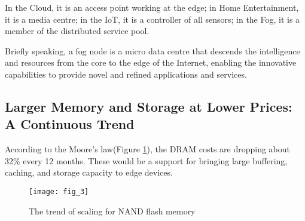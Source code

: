 In the Cloud, it is an access point working at the edge; in Home Entertainment, it is a
media centre; in the IoT, it is a controller of all sensors; in the Fog, it is a member of the
distributed service pool.

Briefly speaking, a fog node is a micro data centre that descends the intelligence and
resources from the core to the edge of the Internet, enabling the innovative capabilities to
provide novel and refined applications and services.

\subsection{Larger Memory and Storage at Lower Prices: A Continuous Trend}
According to the Moore's law(Figure \ref{fig_3}), the DRAM costs are dropping about 32\% every 12
months. These would be a support for bringing large buffering, caching, and storage
capacity to edge devices.

\begin{figure}[htbp]
	\texttt{[image: fig\_3]}
	\caption{The trend of scaling for NAND flash memory }
	\label{fig_3}
\end{figure}
